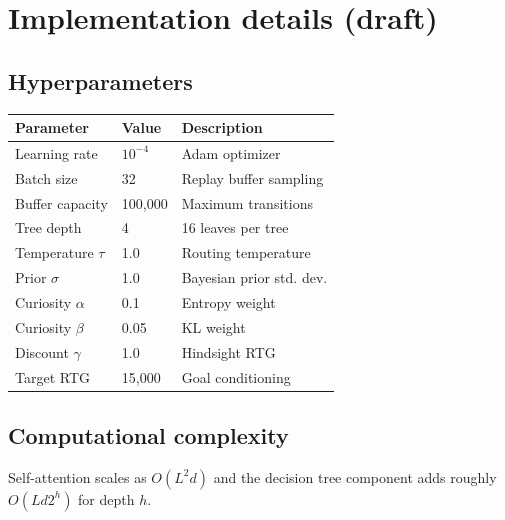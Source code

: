 \documentclass[11pt]{article}
\begin{document}
\appendix
\section{Implementation details (draft)}
\subsection{Hyperparameters}
\begin{center}
\begin{tabular}{@{}lll@{}}
\toprule
Parameter & Value & Description\\
\midrule
Learning rate & $10^{-4}$ & Adam optimizer\\
Batch size & 32 & Replay buffer sampling\\
Buffer capacity & 100,000 & Maximum transitions\\
Tree depth & 4 & 16 leaves per tree\\
Temperature $\tau$ & 1.0 & Routing temperature\\
Prior $\sigma$ & 1.0 & Bayesian prior std. dev.\\
Curiosity $\alpha$ & 0.1 & Entropy weight\\
Curiosity $\beta$ & 0.05 & KL weight\\
Discount $\gamma$ & 1.0 & Hindsight RTG\\
Target RTG & 15,000 & Goal conditioning\\
\bottomrule
\end{tabular}
\end{center}

\subsection{Computational complexity}
Self-attention scales as $O(L^2 d)$ and the decision tree component adds roughly $O(L d 2^h)$ for depth $h$.

\ifdefined\BAAIncluded\else
\end{document}
